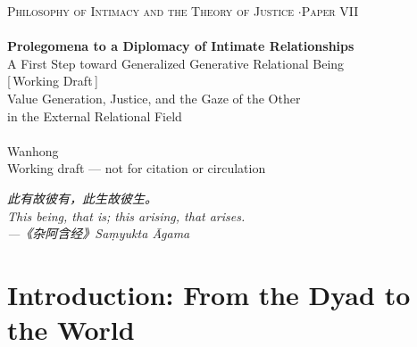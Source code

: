 \documentclass[11pt,a4paper]{article}
\begin{document}
\thispagestyle{empty}
\begin{center}
\vspace*{2cm}
{\footnotesize\color{rosedeep}\scshape Philosophy of Intimacy and the Theory of Justice \quad$\cdot$\quad Paper VII}\\[0.3cm]
\coverrule\\[1.2cm]
{\LARGE\bfseries\color{warnred} Prolegomena to a Diplomacy of Intimate Relationships}\\[0.7cm]
{\large\color{warnred} A First Step toward Generalized Generative Relational Being}\\[0.8cm]
{\small\color{gold} [\,Working Draft\,]}\\[0.8cm]
{\normalsize\color{inksoft} Value Generation, Justice, and the Gaze of the Other\\[0.15cm] in the External Relational Field}\\[2cm]
\coverrule[0.25]\\[0.6cm]
{\normalsize\color{inksoft} Wanhong}\\
\vfill
{\footnotesize\color{gold} Working draft --- not for citation or circulation}
\coverfootnote
\end{center}
\newpage

\thispagestyle{empty}
\vspace*{3cm}
\begin{center}
\begin{minipage}{0.72\linewidth}
\centering\itshape\color{rose}
{\cjk 此有故彼有，此生故彼生。}\\[0.5em]
This being, that is; this arising, that arises.\\[0.4em]
{\upshape\footnotesize\color{gold} ---{\cjk 《杂阿含经》}\quad \emph{Sa\d{m}yukta {\=A}gama}}
\end{minipage}
\end{center}
\newpage

\tableofcontents
\newpage

\section{Introduction: From the Dyad to the World}
\end{document}
